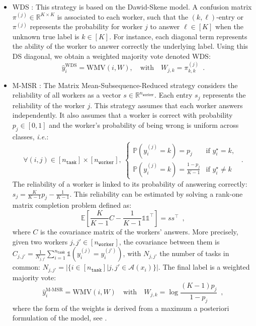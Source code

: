 \documentclass{cap2024}
\begin{document}
\begin{itemize}

    \item WDS \citep{dawid_maximum_1979}:
    This strategy is based on the Dawid-Skene model. A confusion matrix $\pi^{(j)}\in\mathbb{R}^{K\times K}$ is associated to each worker, such that the $(k,\ell)$-entry or $\pi^{(j)}$ represents the probability for worker $j$ to answer $\ell\in[K]$ when the unknown true label is $k\in[K]$. For instance, each diagonal term represents the ability of the worker to answer correctly the underlying label.
  Using this DS diagonal, we obtain a weighted majority vote denoted WDS:
  \begin{equation}
    \hat{y}_i^\text{WDS}= \mathrm{WMV}\left(i, W\right),\quad
    \text{with}\quad W_{j,k} = \pi^{(j)}_{k,k}\enspace.
  \end{equation}
  \item M-MSR \citep{ma2020adversarial}: The Matrix Mean-Subsequence-Reduced strategy considers the reliability of all workers as a vector $s\in\mathbb{R}^{n_\texttt{worker}}$. Each entry $s_j$ represents the reliability of the worker $j$.
  This strategy assumes that each worker answers independently. It also assumes that a worker is correct with probability $p_j\in[0,1]$ and the worker's probability of being wrong is uniform across classes, \emph{i.e.}:
  \[\forall (i,j)\in [n_\texttt{task}]\times [n_\texttt{worker}],\ \begin{cases} \mathbb{P}(y_i^{(j)}=k)=p_j & \text{if } y_i^\star=k, \\ \mathbb{P}(y_i^{(j)}=k)=\frac{1-p_j}{K-1} & \text{if } y_i^\star\neq k\end{cases} \enspace.\]
  The reliability of a worker is linked to its probability of answering correctly: $s_j = \frac{K}{K-1}p_j - \frac{1}{K-1}$.
  This reliability can be estimated by solving a rank-one matrix completion problem defined as:
  \[\mathbb{E}\left[\frac{K}{K-1}C - \frac{1}{K-1}\mathds{1}\mathds{1}^\top\right]=ss^\top \enspace,\]
  where $C$ is the covariance matrix of the workers' answers.
  More precisely, given two workers $j,j' \in [n_\texttt{worker}]$, the covariance between them is $C_{j,j'} = \frac{1}{N_{j,j'}}\sum_{i=1}^{n_\texttt{task}} \mathds{1}(y_i^{(j)}=y_i^{(j')})$, with $N_{j,j'}$ the number of tasks in common: $N_{j,j'}=|\{i \in [n_\texttt{task}] |j,j'\in\mathcal{A}(x_i)\}|$. The final label is a weighted majority vote:
  \begin{equation}
    \hat y_i^{\text{M-MSR}} = \mathrm{WMV}(i, W)\quad \text{with}\quad W_{j,k}=\log\frac{(K-1)p_j}{1-p_j}\enspace,
  \end{equation}
  where the form of the weights is derived from a maximum a posteriori formulation of the model, see \citep[Corollary 9]{li2014error}.


\end{itemize}
\end{document}
